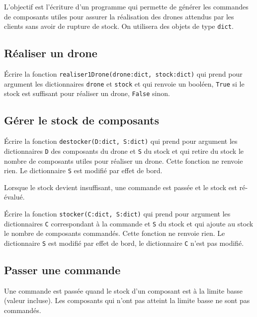 L'objectif est  l'écriture d'un programme qui permette de générer les commandes de composants utiles pour assurer la réalisation des drones attendus par les clients sans avoir de rupture de stock.
On utilisera des objets de type \lstinline{dict}.

\subsection*{Réaliser un drone}


\begin{question}
\'Ecrire la fonction \lstinline{realiser1Drone(drone:dict, stock:dict)} qui prend pour argument les dictionnaires \lstinline{drone} et \lstinline{stock} et qui renvoie un booléen, \lstinline{True} si le stock est suffisant pour réaliser un drone, \lstinline{False} sinon.
\end{question}

\subsection*{Gérer le stock de composants}

\begin{question}
\'Ecrire la fonction \lstinline{destocker(D:dict, S:dict)} qui prend pour argument les dictionnaires \lstinline{D} des composants du drone et \lstinline{S} du stock et qui retire du stock le nombre de composants utiles pour réaliser un drone. Cette fonction ne renvoie rien. Le dictionnaire \lstinline{S} est modifié par effet de bord.
\end{question}

\bigskip

Lorsque le stock devient insuffisant, une commande est passée et le stock est ré-évalué.

\begin{question}
\'Ecrire la fonction \lstinline{stocker(C:dict, S:dict)} qui prend pour argument les dictionnaires \lstinline{C} correspondant à la commande et \lstinline{S} du stock et qui ajoute au stock le nombre de composants commandés. Cette fonction ne renvoie rien. Le dictionnaire \lstinline{S} est modifié par effet de bord, le dictionnaire \lstinline{C} n'est pas modifié.
\end{question}

\subsection*{Passer une commande}
Une commande est passée quand le stock d'un composant est à la limite basse (valeur incluse). Les composants qui n'ont pas atteint la limite basse ne sont pas commandés.

